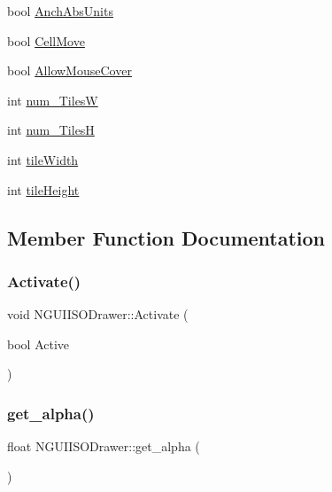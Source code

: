 \begin{DoxyCompactItemize}
\item 
bool \hyperlink{class_n_g_u_i_i_s_o_drawer_ab7108b1a56c3a794fc218d381414619b}{Anch\+Abs\+Units}
\item 
bool \hyperlink{class_n_g_u_i_i_s_o_drawer_a510f36911be7c658254c3d31292cc5bc}{Cell\+Move}
\item 
bool \hyperlink{class_n_g_u_i_i_s_o_drawer_a09f6e97a93d97cbc0d0e3b3e1a501818}{Allow\+Mouse\+Cover}
\item 
int \hyperlink{class_n_g_u_i_i_s_o_drawer_a898a4a0fce9c35a816c9e643fd547191}{num\+\_\+\+TilesW}
\item 
int \hyperlink{class_n_g_u_i_i_s_o_drawer_a896523a16e0abbf1e0d97d4a25a7feb9}{num\+\_\+\+TilesH}
\item 
int \hyperlink{class_n_g_u_i_i_s_o_drawer_ab4309e7a6c923cb9d42fba8a7a78ea83}{tile\+Width}
\item 
int \hyperlink{class_n_g_u_i_i_s_o_drawer_a3495683b1e34a765c4b1b0d80fb2c72d}{tile\+Height}
\end{DoxyCompactItemize}


\subsection{Member Function Documentation}
\hypertarget{class_n_g_u_i_i_s_o_drawer_a0adb8dccc36f4c2c2f0cd5b0eaaf3a66}{}\label{class_n_g_u_i_i_s_o_drawer_a0adb8dccc36f4c2c2f0cd5b0eaaf3a66} 
\subsubsection{\texorpdfstring{Activate()}{Activate()}}
{\footnotesize\ttfamily void N\+G\+U\+I\+I\+S\+O\+Drawer\+::\+Activate (\begin{DoxyParamCaption}\item[{bool}]{Active }\end{DoxyParamCaption})}

\hypertarget{class_n_g_u_i_i_s_o_drawer_a36da1c3d167254dd2cd703a9d871f07e}{}\label{class_n_g_u_i_i_s_o_drawer_a36da1c3d167254dd2cd703a9d871f07e} 
\subsubsection{\texorpdfstring{get\+\_\+alpha()}{get\_alpha()}}
{\footnotesize\ttfamily float N\+G\+U\+I\+I\+S\+O\+Drawer\+::get\+\_\+alpha (\begin{DoxyParamCaption}{ }\end{DoxyParamCaption})}

